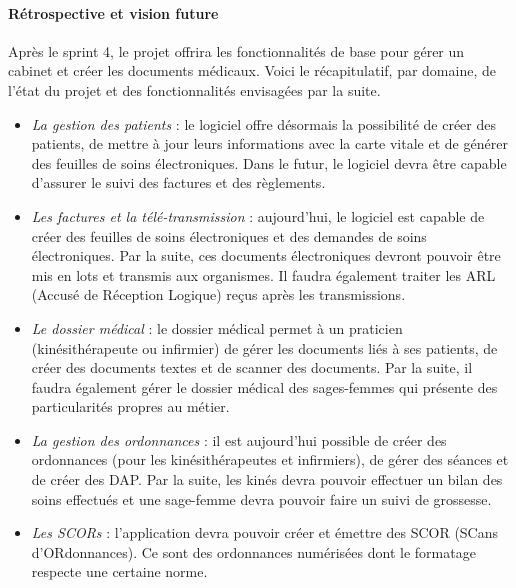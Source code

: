 \paragraph*{Rétrospective et vision future\\}
Après le sprint 4, le projet offrira les fonctionnalités de base pour gérer un cabinet et créer les documents médicaux.
Voici le récapitulatif, par domaine, de l'état du projet et des fonctionnalités envisagées par la suite.
\begin{itemize}
	\item \textit{La gestion des patients} : le logiciel offre désormais la possibilité de créer des patients, de mettre à jour leurs informations avec la carte vitale et de générer des feuilles de soins électroniques.
	Dans le futur, le logiciel devra être capable d'assurer le suivi des factures et des règlements.
	
	\item \textit{Les factures et la télé-transmission} : aujourd'hui, le logiciel est capable de créer des feuilles de soins électroniques et des demandes de soins électroniques. Par la suite, ces documents électroniques devront pouvoir être mis en lots et transmis aux organismes. Il faudra également traiter les ARL (Accusé de Réception Logique) reçus après les transmissions.
	
	\item \textit{Le dossier médical} : le dossier médical permet à un praticien (kinésithérapeute ou infirmier) de gérer les documents liés à ses patients, de créer des documents textes et de scanner des documents. Par la suite, il faudra également gérer le dossier médical des sages-femmes qui présente des particularités propres au métier.
	
	\item \textit{La gestion des ordonnances} : il est aujourd'hui possible de créer des ordonnances (pour les kinésithérapeutes et infirmiers), de gérer des séances et de créer des DAP. Par la suite, les kinés devra pouvoir effectuer un bilan des soins effectués et une sage-femme devra pouvoir faire un suivi de grossesse.
	
	\item \textit{Les SCORs} : l'application devra pouvoir créer et émettre des SCOR (SCans d'ORdonnances). Ce sont des ordonnances numérisées dont le formatage respecte une certaine norme.
\end{itemize} 

